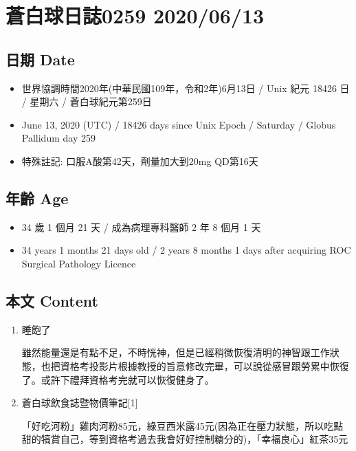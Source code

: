 \documentclass[
]{article}
\providecommand{\tightlist}{%
  \setlength{\itemsep}{0pt}\setlength{\parskip}{0pt}}
\begin{document}
\hypertarget{ux84bcux767dux7403ux65e5ux8a8c0259-20200613}{%
\section{蒼白球日誌0259
2020/06/13}\label{ux84bcux767dux7403ux65e5ux8a8c0259-20200613}}

\hypertarget{ux65e5ux671f-date-12}{%
\subsection{日期 Date}\label{ux65e5ux671f-date-12}}

\begin{itemize}
\tightlist
\item
  世界協調時間2020年(中華民國109年，令和2年)6月13日 / Unix 紀元 18426 日
  / 星期六 / 蒼白球紀元第259日
\item
  June 13, 2020 (UTC) / 18426 days since Unix Epoch / Saturday / Globus
  Pallidum day 259
\item
  特殊註記: 口服A酸第42天，劑量加大到20mg QD第16天
\end{itemize}

\hypertarget{ux5e74ux9f61-age-12}{%
\subsection{年齡 Age}\label{ux5e74ux9f61-age-12}}

\begin{itemize}
\tightlist
\item
  34 歲 1 個月 21 天 / 成為病理專科醫師 2 年 8 個月 1 天
\item
  34 years 1 months 21 days old / 2 years 8 months 1 days after
  acquiring ROC Surgical Pathology Licence
\end{itemize}

\hypertarget{ux672cux6587-content-12}{%
\subsection{本文 Content}\label{ux672cux6587-content-12}}

\begin{enumerate}
\def\labelenumi{\arabic{enumi}.}
\item
  睡飽了

  雖然能量還是有點不足，不時恍神，但是已經稍微恢復清明的神智跟工作狀態，也把資格考投影片根據教授的旨意修改完畢，可以說從感冒跟勞累中恢復了。或許下禮拜資格考完就可以恢復健身了。
\item
  蒼白球飲食誌暨物價筆記{[}1{]}

  「好吃河粉」雞肉河粉85元，綠豆西米露45元(因為正在壓力狀態，所以吃點甜的犒賞自己，等到資格考過去我會好好控制糖分的)，「幸福良心」紅茶35元
\end{enumerate}
\end{document}
